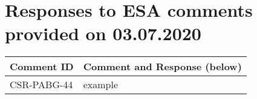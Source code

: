 
\section{Responses to ESA comments provided on 03.07.2020}
\label{sec:ESA:comments:1}


\setlength\LTleft{0pt}
\setlength\LTright{0pt}
\tiny 
\begin{longtable}{|p{1.5cm}|p{12cm}|@{}}
\label{table:comments:responses} 
\textbf{Comment ID}&\textbf{Comment and Response (below)}\\
\hline
CSR-PABG-44&
example
\\

\hline                                                            
\end{longtable}
\normalsize

\clearpage